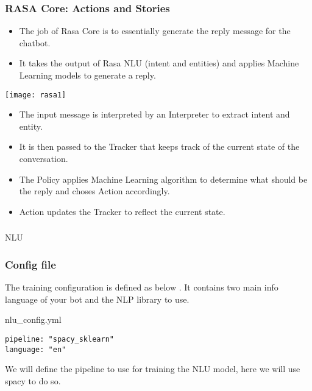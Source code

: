  \begin{frame}[fragile]\frametitle{RASA Core: Actions and Stories}
\begin{itemize}
\item The job of Rasa Core is to essentially generate the reply message for the chatbot. 
\item It takes the output of Rasa NLU (intent and entities) and applies Machine Learning models to generate a reply.
\end{itemize}

\begin{center}
\texttt{[image: rasa1]}
\end{center}

\begin{itemize}
\item The input message is interpreted by an Interpreter to extract intent and entity. 
\item It is then passed to the Tracker that keeps track of the current state of the conversation. 
\item The Policy applies Machine Learning algorithm to determine what should be the reply and choses Action accordingly.
\item Action updates the Tracker to reflect the current state.
\end{itemize}

\end{frame}




\begin{frame}[fragile]\frametitle{}
\begin{center}
{\Large NLU}
\end{center}
\end{frame}

 \begin{frame}[fragile]\frametitle{Config file}
 
 The training configuration is defined as below . It contains two main info language of your bot and the NLP library to use.
 
 
nlu\_config.yml


\begin{lstlisting}
pipeline: "spacy_sklearn"
language: "en"
\end{lstlisting}

We will define the pipeline to use for training the NLU model, here we will use spacy to do so.
\end{frame}

